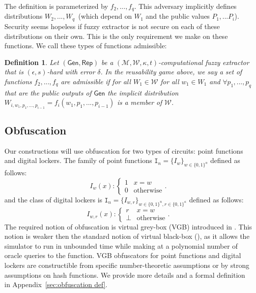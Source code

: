 \documentclass[11pt]{article}
\newcommand{\apref}[1]{\mbox{Appendix~\ref{#1}}}
\newcommand{\class}[1]{{\ensuremath{\mathsf{#1}}}}
\newcommand{\gen}{\ensuremath{\class{Gen}}\xspace}
\newcommand{\rep}{\ensuremath{\class{Rep}}\xspace}
\newcommand{\zo}{\ensuremath{\{0, 1\}}}
\newtheorem{definition}[theorem]{Definition}
\begin{document}
The definition is parameterized by $f_2,..., f_q$.  This adversary implicitly defines distributions $W_2,..., W_q$~(which depend on $W_1$ and the public values $P_1,... P_i$).  Security seems hopeless if fuzzy extractor is not secure on each of these distributions on their own.  This is the only requirement we make on these functions.  We call these types of functions admissible:

\begin{definition}
Let $(\gen, \rep)$ be a $(\mathcal{M}, \mathcal{W}, \kappa, t)$-computational fuzzy extractor that is $(\epsilon, s)$-hard with error $\delta$.  In the reusability game above, we say a set of functions $f_2,..., f_q$ are \emph{admissible} if for all $W_1\in \mathcal{W}$ for all $w_1\in W_1$ and $\forall p_1,..., p_q$ that are the public outputs of $\gen$ the implicit distribution $W_{i,w_1,p_1,..., p_{i-1}} = f_i(w_1,p_1,..., p_{i-1})$ is a member of $\mathcal{W}$.
\end{definition}

\subsection{Obfuscation}
Our constructions will use obfuscation for two types of circuits: point functions and digital lockers. The family of point functions $\mathtt{I}_n = \{I_w\}_{w \in \zo^n}$ defined as follows:
\[
I_w(x):\begin{cases} 1 & x=w\\0 & \text{otherwise}\end{cases}.
\]
and the class of digital lockers is $\mathtt{I}_n = \{I_{w, r}\}_{w \in \zo^n, r\in\zo^\kappa}$ defined as follows:
\[
I_{w, r}(x):\begin{cases} r & x=w\\\perp & \text{otherwise}\end{cases}.
\]
The required notion of obfuscation is virtual grey-box (VGB) introduced in \cite{bitansky2010strong}. This notion is weaker then the standard notion of virtual black-box (\cite{barak2001possibility}), as it allows the simulator to run in unbounded time while making at a polynomial number of oracle queries to the function. VGB obfuscators for point functions and digital lockers are constructible from specific number-theoretic assumptions or by strong assumptions on hash functions.  We provide more details and a formal definition in \apref{sec:obfuscation def}.
\end{document}
